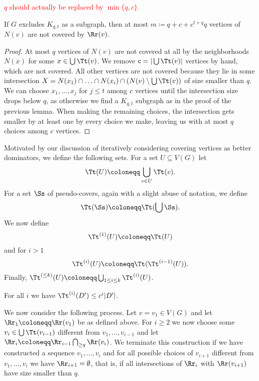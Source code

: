 %
%

\textcolor{red}{$q$ should actually be replaced by $\min\{q,c\}$.}

\begin{lemma}
If $G$ excludes $K_{q,t}$ as a subgraph, then at most $m\coloneqq q+c+c^{t+q}q$ vertices of $N(v)$ are not covered by $\Rr(v)$.
\end{lemma}
\begin{proof}
At most $q$ vertices of $N(v)$ are not covered at all by the
neighborhoods $N(x)$ for some $x\in \bigcup\Tt(v)$. We remove
$c=|\bigcup\Tt(v)|$ vertices by hand, which are not covered.
All other vertices are not covered because they lie in some
intersection $X=N(x_1)\cap\ldots\cap N(x_i)\cap (N(v)
\setminus \bigcup\Tt(v))$ of size smaller than $q$. We can choose
$x_1,\ldots, x_j$ for $j\leq t$ among $c$ vertices
until the intersection size drops
below $q$, as otherwise we find a $K_{q,t}$ subgraph as in the
proof of the previous lemma. When making the remaining
choices, the intersection gets smaller by at least one by every
choice we make, leaving us with at most $q$ choices among $c$
vertices.
\end{proof}


Motivated by our discussion of iteratively considering covering
vertices as better dominators, we define the following sets.
For a set $U\subseteq V(G)$ let \[\Tt(U)\coloneqq \bigcup_{v\in U}\Tt(v).\]
For a set $\Ss$ of pseudo-covers, again with a slight
abuse of notation, we define \[\Tt(\Ss)\coloneqq \Tt(\bigcup \Ss).\]
We now define
\[\Tt^{(1)}(U)\coloneqq \Tt(U)\]
and  for $i>1$
\[\Tt^{(i)}(U)\coloneqq \Tt(\Tt^{(i-1)}(U)).\]
Finally, $\Tt^{(\leq k)}(U)\coloneqq \bigcup_{1\leq i\leq k}\Tt^{(i)}(U)$.

\begin{lemma}
For all $i$ we have $\Tt^{(i)}(D')\leq c^i|D'|$.
\end{lemma}

We now consider the following process. Let $v=v_1\in V(G)$ and let
$\Rr_1\coloneqq \Rr(v_1)$ be as defined above.
For $i\geq 2$ we now choose some $v_i\in \bigcup\Tt(v_{i-1})$
different from $v_1,\ldots, v_{i-1}$ and let
$\Rr_i\coloneqq \Rr_{i-1}\bigcap_{\geq q}\Rr(v_i)$.
We terminate this construction
if we have constructed a sequence $v_1,\ldots,v_i$ and for all
possible choices of $v_{i+1}$ different from $v_1,\ldots, v_i$ we have
$\Rr_{i+1}=\emptyset$, that is, if all intersections of $\Rr_i$ with
$\Rr(v_{i+1})$ have size smaller than $q$.

